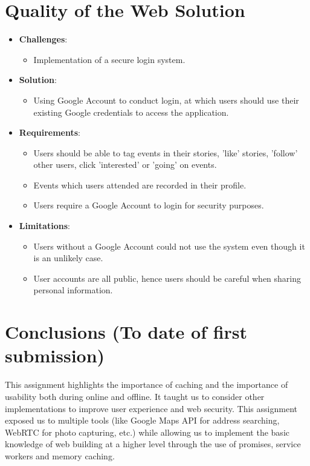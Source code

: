\documentclass[11pt, a4paper]{article}
\begin{document}
\section{Quality of the Web Solution}
\begin{itemize}
  \item \textbf{Challenges}:
  \begin{itemize}
    \item Implementation of a secure login system.
  \end{itemize}
  \item \textbf{Solution}:
  \begin{itemize}
    \item Using Google Account to conduct login, at which users should use their existing Google 
    credentials to access the application.
  \end{itemize}
  \item \textbf{Requirements}:
  \begin{itemize}
    \item Users should be able to tag events in their stories, 'like' stories, 'follow' other 
    users, click 'interested' or 'going' on events.
    \item Events which users attended are recorded in their profile.
    \item Users require a Google Account to login for security purposes.
  \end{itemize}
  \item \textbf{Limitations}:
  \begin{itemize}
    \item Users without a Google Account could not use the system even though it is an unlikely case.
    \item User accounts are all public, hence users should be careful when sharing personal information.
  \end{itemize}
\end{itemize}

\section{Conclusions (To date of first submission)}
This assignment highlights the importance of caching and the importance of usability both during 
online and offline. It taught us to consider other implementations to improve user experience 
and web security. This assignment exposed us to multiple tools (like Google Maps API for 
address searching, WebRTC for photo capturing, etc.) while allowing us to implement the basic 
knowledge of web building at a higher level through the use of promises, service workers and memory 
caching.
\end{document}
